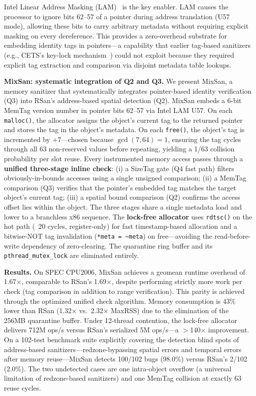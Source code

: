 \documentclass[cmc,article,submit,moreauthors,pdftex]{Definitions/tsp}
\begin{document}
Intel Linear Address Masking (LAM)~\cite{intel2020lam} is the key enabler. LAM causes the processor to ignore bits 62--57 of a pointer during address translation (U57 mode), allowing these bits to carry arbitrary metadata without requiring explicit masking on every dereference. This provides a zero-overhead substrate for embedding identity tags in pointers---a capability that earlier tag-based sanitizers (e.g., CETS's key-lock mechanism~\cite{nagarakatte2010cets}) could not exploit because they required explicit tag extraction and comparison via disjoint metadata table lookups.

\textbf{MixSan: systematic integration of Q2 and Q3.}
We present MixSan, a memory sanitizer that systematically integrates pointer-based identity verification (Q3) into RSan's address-based spatial detection (Q2). MixSan embeds a 6-bit MemTag version number in pointer bits 62--57 via Intel LAM U57. On each \texttt{malloc()}, the allocator assigns the object's current tag to the returned pointer and stores the tag in the object's metadata. On each \texttt{free()}, the object's tag is incremented by +7---chosen because $\gcd(7,64)=1$, ensuring the tag cycles through all 63 non-reserved values before repeating, yielding a 1/63 collision probability per slot reuse. Every instrumented memory access passes through a \textbf{unified three-stage inline check}: (i) a SizeTag gate (Q4 fast path) filters obviously-in-bounds accesses using a single unsigned comparison; (ii) a MemTag comparison (Q3) verifies that the pointer's embedded tag matches the target object's current tag; (iii) a spatial bound comparison (Q2) confirms the access offset lies within the object. The three stages share a single metadata load and lower to a branchless x86 sequence. The \textbf{lock-free allocator} uses \texttt{rdtsc()} on the hot path (~20 cycles, register-only) for fast timestamp-based allocation and a bitwise-NOT tag invalidation (\texttt{*meta = \textasciitilde meta}) on free---avoiding the read-before-write dependency of zero-clearing. The quarantine ring buffer and its \texttt{pthread\_mutex\_lock} are eliminated entirely.

\textbf{Results.}
On SPEC CPU2006, MixSan achieves a geomean runtime overhead of 1.67$\times$, comparable to RSan's 1.69$\times$, despite performing strictly more work per check (tag comparison in addition to range verification). This parity is achieved through the optimized unified check algorithm. Memory consumption is 43\% lower than RSan (1.32$\times$ vs.\ 2.32$\times$ MaxRSS) due to the elimination of the 256MB quarantine buffer. Under 12-thread contention, the lock-free allocator delivers 712M ops/s versus RSan's serialized 5M ops/s---a $>$140$\times$ improvement. On a 102-test benchmark suite explicitly covering the detection blind spots of address-based sanitizers---redzone-bypassing spatial errors and temporal errors after memory reuse---MixSan detects 100/102 bugs (98.0\%) versus RSan's 2/102 (2.0\%). The two undetected cases are one intra-object overflow (a universal limitation of redzone-based sanitizers) and one MemTag collision at exactly 63 reuse cycles.
\end{document}
